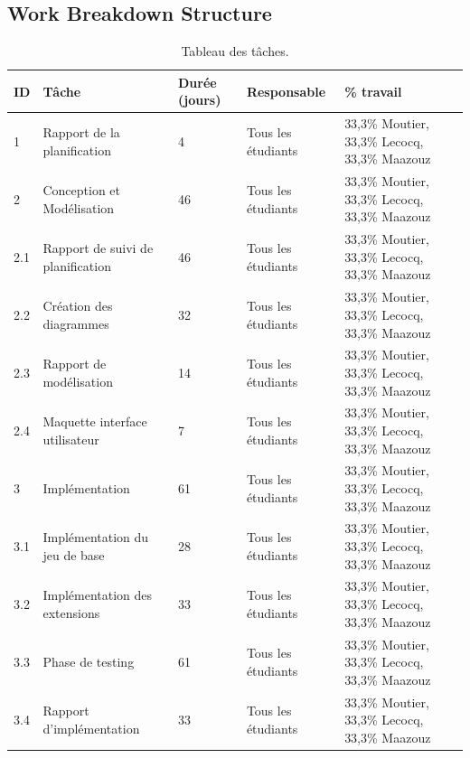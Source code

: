 \documentclass[]{article}
\begin{document}
\subsection{Work Breakdown Structure}

\begin{table}[htbp]
\begin{center}
\begin{tabular}{|p{1cm}|p{5cm}||p{1.5cm}|p{3cm}|p{4cm}|}
\hline
\textbf{ID} & T\^ache & Durée (jours) & Responsable & \% travail\\
\hline\hline
1 & Rapport de la planification & 4 & Tous les étudiants & 33,3\% Moutier, 33,3\% Lecocq, 33,3\% Maazouz\\
\hline
\hline
2 & Conception et Modélisation & 46 & Tous les étudiants & 33,3\% Moutier, 33,3\% Lecocq, 33,3\% Maazouz\\
\hline
2.1 & Rapport de suivi de planification & 46 & Tous les étudiants & 33,3\% Moutier, 33,3\% Lecocq, 33,3\% Maazouz\\
\hline
2.2 & Création des diagrammes & 32 & Tous les étudiants & 33,3\% Moutier, 33,3\% Lecocq, 33,3\% Maazouz\\
\hline
2.3 & Rapport de modélisation & 14 & Tous les étudiants & 33,3\% Moutier, 33,3\% Lecocq, 33,3\% Maazouz\\
\hline
2.4 & Maquette interface utilisateur & 7 & Tous les étudiants & 33,3\% Moutier, 33,3\% Lecocq, 33,3\% Maazouz\\
\hline
\hline
3 & Implémentation & 61 & Tous les étudiants & 33,3\% Moutier, 33,3\% Lecocq, 33,3\% Maazouz\\
\hline
3.1 & Implémentation du jeu de base & 28 & Tous les étudiants & 33,3\% Moutier, 33,3\% Lecocq, 33,3\% Maazouz\\
\hline
3.2 & Implémentation des extensions & 33 & Tous les étudiants & 33,3\% Moutier, 33,3\% Lecocq, 33,3\% Maazouz\\
\hline
3.3 & Phase de testing & 61 & Tous les étudiants & 33,3\% Moutier, 33,3\% Lecocq, 33,3\% Maazouz\\
\hline
3.4 & Rapport d'implémentation & 33 & Tous les étudiants & 33,3\% Moutier, 33,3\% Lecocq, 33,3\% Maazouz\\
\hline
\end{tabular}
\end{center}
   \caption{Tableau des t\^aches.}
   \label{tab:WBS}
\end{table}

\newpage
\end{document}
